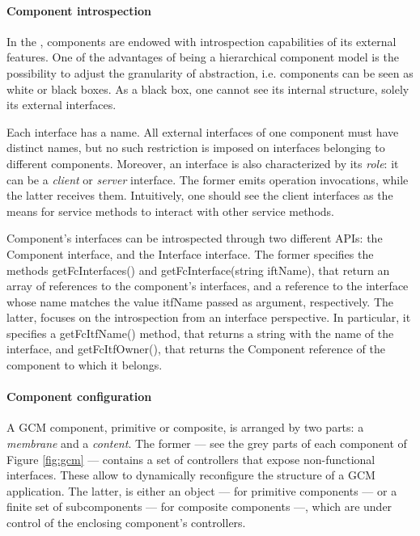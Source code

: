			
			
			
	\paragraph{Component introspection}
	
	In the \gcm, components are endowed with introspection capabilities of its external features.	
	One of the advantages of being a hierarchical component model is the 
	possibility to  adjust the granularity of abstraction, i.e. components can be seen as white 
	or black boxes. As a black box, one cannot see its internal structure, solely its
	external interfaces. 
	
		Each interface has a name. All external interfaces of one component must have distinct names,
	but no such restriction is imposed on interfaces belonging to different components. Moreover,
	an interface is also characterized by its \textit{role}: it can be a \textit{client} or \textit{server}
	interface. The former emits operation invocations, while the latter receives them. Intuitively, 
	one should see the client interfaces as the means for service methods to interact with other
	service methods.
			
				Component's interfaces can be introspected through two different \ac{API}s: the 
			\textsf{Component} interface, and the \textsf{Interface} interface. The former
			specifies the methods \textsf{getFcInterfaces()} and \textsf{getFcInterface(string iftName)},
			that return an array of references to the component's interfaces, and a reference
			to the interface whose name matches the value \textsf{itfName} passed as argument, respectively.
			The latter, focuses on the introspection from an interface perspective. In particular, it
			specifies a \textsf{getFcItfName()} method, that returns a string with the name of the interface,
			and \textsf{getFcItfOwner()}, that returns the \textsf{Component} reference of the component
			to which it belongs.
			
			
	\paragraph{Component configuration}
		
			A \ac{GCM} component, primitive or composite, is arranged by two parts: a 
	\textit{membrane} and a \textit{content}. The former --- see the grey parts of each
	component of Figure \ref{fig:gcm} --- contains a set of controllers	that expose 
	non-functional interfaces. These allow to dynamically reconfigure the structure
	of a \ac{GCM} application. The latter, is either an object --- for primitive components ---
	or a finite set of subcomponents --- for composite components ---, 
	which are under control of the enclosing component's controllers.
	
